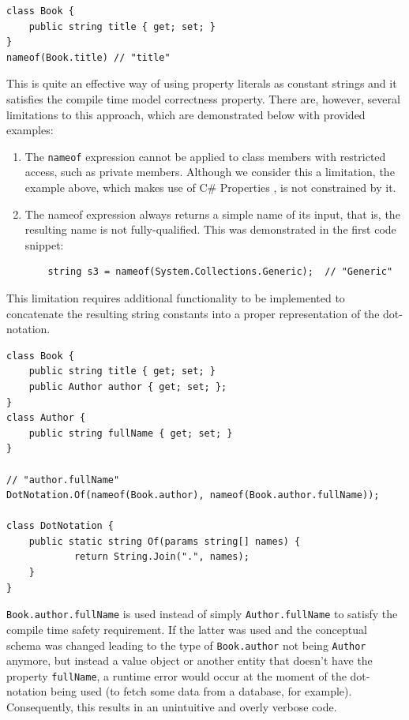 \begin{verbatim}
class Book {
    public string title { get; set; }
}
nameof(Book.title) // "title"
\end{verbatim}

This is quite an effective way of using property literals as constant strings and it satisfies the compile time model correctness property. There are, however, several limitations to this approach, which are demonstrated below with provided examples:

\begin{enumerate}
    \item The \texttt{nameof} expression cannot be applied to class members with restricted access, such as private members. Although we consider this a limitation, the example above, which makes use of C\# Properties \cite{cSharp-props}, is not constrained by it.

    \item The nameof expression always returns a simple name of its input, that is, the resulting name is not fully-qualified. This was demonstrated in the first code snippet:
\begin{verbatim}
    string s3 = nameof(System.Collections.Generic);  // "Generic"
\end{verbatim}

\end{enumerate}

This limitation requires additional functionality to be implemented to concatenate the resulting string constants into a proper representation of the dot-notation.

\begin{verbatim}
class Book {
    public string title { get; set; }
    public Author author { get; set; };
}
class Author {
    public string fullName { get; set; }
}

// "author.fullName"
DotNotation.Of(nameof(Book.author), nameof(Book.author.fullName));

class DotNotation {
    public static string Of(params string[] names) {
            return String.Join(".", names);
    }
}
\end{verbatim}

\texttt{Book.author.fullName} is used instead of simply \texttt{Author.fullName} to satisfy the compile time safety requirement. If the latter was used and the conceptual schema was changed leading to the type of \texttt{Book.author} not being \texttt{Author} anymore, but instead a value object or another entity that doesn’t have the property \texttt{fullName}, a runtime error would occur at the moment of the dot-notation being used (to fetch some data from a database, for example). Consequently, this results in an unintuitive and overly verbose code.

